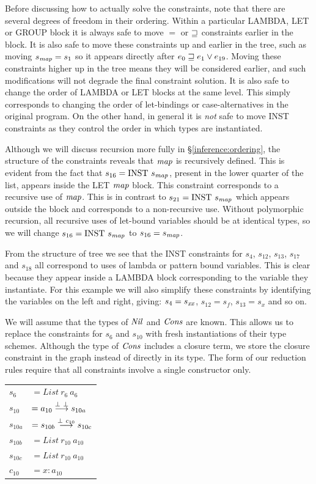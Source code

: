 Before discussing how to actually solve the constraints, note that there are several degrees of freedom in their ordering. Within a particular LAMBDA, LET or GROUP block it is always safe to move $=$ or $\sqsupseteq$ constraints earlier in the block. It is also safe to move these constraints up and earlier in the tree, such as moving $s_{\operatorname{\mathit{map}}} = s_1$ so it appears directly after $e_0 \sqsupseteq e_1 \lor e_{19}$. Moving these constraints higher up in the tree means they will be considered earlier, and such modifications will not degrade the final constraint solution. It is also safe to change the order of LAMBDA or LET blocks at the same level. This simply corresponds to changing the order of let-bindings or case-alternatives in the original program. On the other hand, in general it is \emph{not} safe to move INST constraints as they control the order in which types are instantiated.

Although we will discuss recursion more fully in \S\ref{inference:ordering}, the structure of the constraints reveals that $\operatorname{\mathit{map}}$ is recursively defined. This is evident from the fact that $s_{16} = \textrm{INST} \ s_{\operatorname{\mathit{map}}}$, present in the lower quarter of the list, appears inside the LET $\operatorname{\mathit{map}}$ block. This constraint corresponds to a recursive use of $\operatorname{\mathit{map}}$. This is in contrast to $s_{21} = \textrm{INST} \ s_{\operatorname{\mathit{map}}}$ which appears outside the block and corresponds to a non-recursive use. Without polymorphic recursion, all recursive uses of let-bound variables should be at identical types, so we will change $s_{16} = \textrm{INST} \ s_{\operatorname{\mathit{map}}}$ to $s_{16} = s_{\operatorname{\mathit{map}}}$.

From the structure of tree we see that the INST constraints for $s_4$, $s_{12}$, $s_{13}$, $s_{17}$ and $s_{18}$ all correspond to uses of lambda or pattern bound variables. This is clear because they appear inside a LAMBDA block corresponding to the variable they instantiate. For this example we will also simplify these constraints by identifying the variables on the left and right, giving: $s_4 = s_{\operatorname{\mathit{xx}}}$, $s_{12} = s_f$, $s_{13} = s_x$ and so on.

We will assume that the types of $\operatorname{\mathit{Nil}}$ and $\operatorname{\mathit{Cons}}$ are known. This allows us to replace the constraints for $s_6$ and $s_{10}$ with fresh instantiations of their type schemes. Although the type of $\operatorname{\mathit{Cons}}$ includes a closure term, we store the closure constraint in the graph instead of directly in its type. The form of our reduction rules require that all constraints involve a single constructor only.

\qq\qq
\begin{tabular}{ll}
$s_6$ 		& $= List \ r_6 \ a_6$ \\
$s_{10}$	& $= a_{10} \stackrel{\bot \ \bot}{\longrightarrow} s_{10a}$ \\
$s_{10a}$	& $= s_{10b} \stackrel{\bot \ c_{10}}{\longrightarrow} s_{10c}$ \\
$s_{10b}$	& $= List \ r_{10} \ a_{10}$ \\
$s_{10c}$	& $= List \ r_{10} \ a_{10}$ \\
$c_{10}$	& $= x : a_{10}$
\end{tabular}

